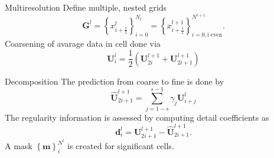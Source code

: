 \documentclass{beamer}
\begin{document}
\begin{frame}{Multiresolution}
    Define multiple, nested grids
    \begin{equation*}
        \mathbf{G}^{l} = \left\{ x^{l}_{i+\frac{1}{2}} \right\}_{i=0}^{N_{l}} =
            \left\{ x^{l+1}_{i+\frac{1}{2}} \right\}_{i=0,\text{i even}}^{N^{l+1}}.
    \end{equation*}
    Coarsening of avarage data in cell done via
    \begin{equation*}
        \mathbf{U}^{l}_{i} = \frac{1}{2} \left( \mathbf{U}^{l+1}_{2i} + \mathbf{U}^{l+1}_{2i+1} \right)
    \end{equation*}
\end{frame}

\begin{frame}{Decomposition}
    The prediction from coarse to fine is done by
    \begin{equation*}
        \mathbf{\hat{U}}^{l+1}_{2i+1} = \sum_{j=1-s}^{s-1} \gamma_{j} \mathbf{U}^{l}_{i+j}
    \end{equation*}
    The regularity information is assessed by computing detail coefficients as
    \begin{equation*}
        \mathbf{d}^{l}_{i} = \mathbf{U}^{l+1}_{2i+1} - \mathbf{\hat{U}}^{l+1}_{2i+1}.
    \end{equation*}
    A mask $\left\{ \mathbf{m} \right\}_{i}^{N^{l}}$ is created for significant cells.
\end{frame}
\end{document}
